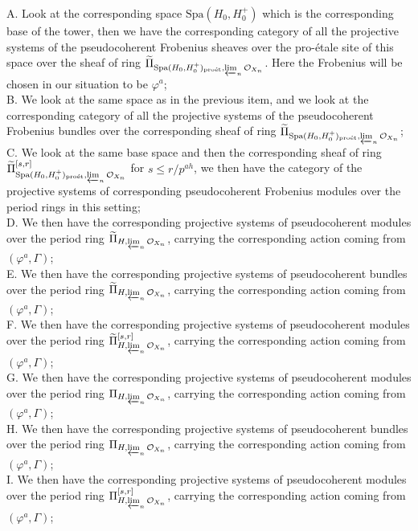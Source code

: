 \documentclass[12pt]{amsart}
\theoremstyle{definition}
\numberwithin{equation}{section}
\begin{document}
\noindent A. Look at the corresponding space $\mathrm{Spa}(H_0,H_0^+)$ which is the corresponding base of the tower, then we have the corresponding category of all the projective systems of the pseudocoherent Frobenius sheaves over the pro-\'etale site of this space over the sheaf of ring $\widetilde{\Pi}_{\mathrm{Spa}(H_0,H_0^+)_\text{pro\'et},\varprojlim_n\mathcal{O}_{X_n}}$. Here the Frobenius will be chosen in our situation to be $\varphi^a$;\\
\noindent B. We look at the same space as in the previous item, and we look at the corresponding category of all the projective systems of the pseudocoherent Frobenius bundles over the corresponding sheaf of ring $\widetilde{\Pi}_{\mathrm{Spa}(H_0,H_0^+)_\text{pro\'et},\varprojlim_n\mathcal{O}_{X_n}}$;\\
\noindent C. We look at the same base space and then the corresponding sheaf of ring $\widetilde{\Pi}^{[s,r]}_{\mathrm{Spa}(H_0,H_0^+)_\text{pro\'et},\varprojlim_n\mathcal{O}_{X_n}}$ for $s\leq r/p^{ah}$, we then have the category of the projective systems of corresponding pseudocoherent Frobenius modules over the period rings in this setting;\\
\noindent D. We then have the corresponding projective systems of  pseudocoherent modules over the period ring ${\widetilde{\Pi}}_{H,\varprojlim_n\mathcal{O}_{X_n}}$, carrying the corresponding action coming from $(\varphi^a,\Gamma)$;\\
\noindent E. We then have the corresponding projective systems of pseudocoherent bundles over the period ring ${\widetilde{\Pi}}_{H,\varprojlim_n\mathcal{O}_{X_n}}$, carrying the corresponding action coming from $(\varphi^a,\Gamma)$;\\
\noindent F. We then have the corresponding projective systems of pseudocoherent modules over the period ring ${\widetilde{\Pi}}^{[s,r]}_{H,\varprojlim_n\mathcal{O}_{X_n}}$, carrying the corresponding action coming from $(\varphi^a,\Gamma)$;\\
\noindent G. We then have the corresponding projective systems of pseudocoherent modules over the period ring ${{\Pi}}_{H,\varprojlim_n\mathcal{O}_{X_n}}$, carrying the corresponding action coming from $(\varphi^a,\Gamma)$;\\
\noindent H. We then have the corresponding projective systems of pseudocoherent bundles over the period ring ${{\Pi}}_{H,\varprojlim_n\mathcal{O}_{X_n}}$, carrying the corresponding action coming from $(\varphi^a,\Gamma)$;\\
\noindent I. We then have the corresponding projective systems of pseudocoherent modules over the period ring ${{\Pi}}^{[s,r]}_{H,\varprojlim_n\mathcal{O}_{X_n}}$, carrying the corresponding action coming from $(\varphi^a,\Gamma)$;\\
\end{document}
